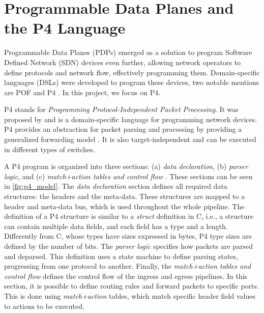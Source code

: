 \section{Programmable Data Planes and the P4 Language}
\label{sec:bg:pdp}


Programmable Data Planes (PDPs) emerged as a solution to program Software Defined Network (SDN) devices even further, allowing network operators to define protocols and network flow, effectively programming them. Domain-specific languages (DSLs) were developed to program these devices, two notable mentions are POF \cite{Song2013} and P4 \cite{Bosshart2014}. In this project, we focus on P4.


\label{sec:bg:p4}

P4 stands for \textit{Programming Protocol-Independent Packet Processing}. It was proposed by  and is a domain-specific language for programming network devices. P4 provides an abstraction for packet parsing and processing by providing a generalized forwarding model \cite{Cordeiro2017}. It is also target-independent and can be executed in different types of switches.

A P4 program is organized into three sections: (a) \textit{data declaration}, (b) \textit{parser logic}, and (c) \textit{match+action tables and control flow} \cite{Cordeiro2017}. These sections can be seen in \autoref{fig:p4_model}. The \textit{data declaration} section defines all required data structures: the headers and the meta-data. These structures are mapped to a header and meta-data bus, which is used throughout the whole pipeline. The definition of a P4 structure is similar to a \textit{struct} definition in C, i.e., a structure can contain multiple data fields, and each field has a type and a length. Differently from C, whose types have sizes expressed in bytes, P4 type sizes are defined by the number of bits. The \textit{parser logic} specifies how packets are parsed and deparsed. This definition uses a state machine to define parsing states, progressing from one protocol to another. Finally, the \textit{match+action tables and control flow} defines the control flow of the ingress and egress pipelines. In this section, it is possible to define routing rules and forward packets to specific ports. This is done using \textit{match+action} tables, which match specific header field values to actions to be executed.

